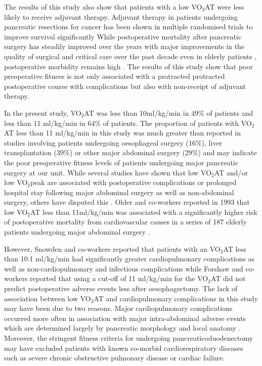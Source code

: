 The results of this study also show that patients with a low VO$_2$AT were less likely to receive adjuvant therapy. Adjuvant therapy in patients undergoing pancreatic resections for cancer has been shown in multiple randomised trials to improve survival significantly \parencite{neoptolemos_randomized_2004, neoptolemos_adjuvant_2009}
While postoperative mortality after pancreatic surgery has steadily improved over the years with major improvements in the quality of surgical and critical care over the past decade \parencite{winter_1423_2006} even in elderly patients \parencite{makary_pancreaticoduodenectomy_2006}, postoperative morbidity remains high \parencite{mann_review_2010}. The results of this study show that poor preoperative fitnees is not only associated with a protracted protracted postoperative course with complications but also with non-receipt of adjuvant therapy.

In the present study, VO$_2$AT was less than 10ml/kg/min in 49\% of patients and less than 11 ml/kg/min in 64\% of patients. The proportion of patients with VO$_2$AT less than 11 ml/kg/min in this study was much greater than reported in studies involving patients undergoing oesophageal surgery (16\%),\parencite{forshaw_is_2008} liver transplantation (39\%)\parencite{epstein_aerobic_2004} or other major abdominal surgery (29\%)\parencite{older_preoperative_1993} and may indicate the poor preoperative fitness levels of patients undergoing major pancreatic surgery at our unit. While several studies have shown that low VO$_2$AT and/or low VO$_2$peak are associated with postoperative complications or prolonged hospital stay following major abdominal surgery as well as non-abdominal surgery,\parencite{older_preoperative_1993, epstein_aerobic_2004, mccullough_cardiorespiratory_2006, nagamatsu_preoperative_2001, older_cardiopulmonary_1999, older_clinical_2004} others have disputed this \parencite{forshaw_is_2008, clayton_cardiopulmonary_2011, hightower_pilot_2010}. Older and co-workers reported in 1993 that low VO$_2$AT less than 11ml/kg/min was associated with a significantly higher risk of postoperative mortality from cardiovascular causes in a series of 187 elderly patients undergoing major abdominal surgery \parencite{older_preoperative_1993}.

However, Snowden and co-workers \parencite{snowden_submaximal_2010} reported that patients with an VO$_2$AT less than 10.1 ml/kg/min had significantly greater cardiopulmonary complications as well as non-cardiopulmonary and infectious complications while Forshaw and co-workers \parencite{forshaw_is_2008} reported that using a cut-off of 11 ml/kg/min for the VO$_2$AT did not predict postoperative adverse events less after oesophagectomy. The lack of association between low VO$_2$AT and cardiopulmonary complications in this study may have been due to two reasons. Major cardiopulmonary complications occurred more often in association with major intra-abdominal adverse events which are determined largely by pancreatic morphology and local anatomy \parencite{braga_prognostic_2011}. Moreover, the stringent fitness criteria for undergoing pancreaticoduodenectomy may have excluded patients with known co-morbid cardiorespiratory diseases such as severe chronic obstructive pulmonary disease or cardiac failure.

